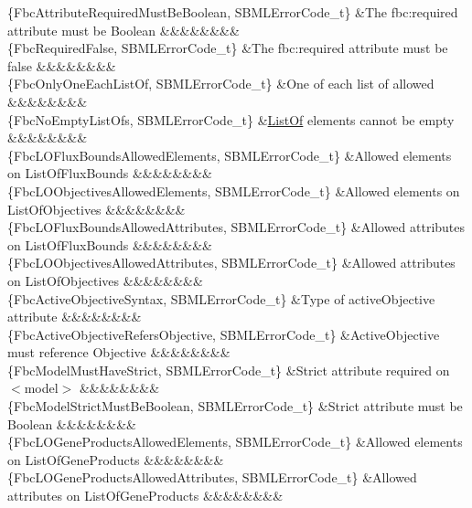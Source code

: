 \begin{DoxyParagraph}{}
\begin{longtabu}
\{Fbc\+Attribute\+Required\+Must\+Be\+Boolean, S\+B\+M\+L\+Error\+Code\+\_\+t\} &The fbc\+:required attribute must be Boolean &&&&&&&&\\
\{Fbc\+Required\+False, S\+B\+M\+L\+Error\+Code\+\_\+t\} &The fbc\+:required attribute must be \textquotesingle{}false\textquotesingle{} &&&&&&&&\\
\{Fbc\+Only\+One\+Each\+List\+Of, S\+B\+M\+L\+Error\+Code\+\_\+t\} &One of each list of allowed &&&&&&&&\\
\{Fbc\+No\+Empty\+List\+Ofs, S\+B\+M\+L\+Error\+Code\+\_\+t\} &\hyperlink{class_list_of}{List\+Of} elements cannot be empty &&&&&&&&\\
\{Fbc\+L\+O\+Flux\+Bounds\+Allowed\+Elements, S\+B\+M\+L\+Error\+Code\+\_\+t\} &Allowed elements on List\+Of\+Flux\+Bounds &&&&&&&&\\
\{Fbc\+L\+O\+Objectives\+Allowed\+Elements, S\+B\+M\+L\+Error\+Code\+\_\+t\} &Allowed elements on List\+Of\+Objectives &&&&&&&&\\
\{Fbc\+L\+O\+Flux\+Bounds\+Allowed\+Attributes, S\+B\+M\+L\+Error\+Code\+\_\+t\} &Allowed attributes on List\+Of\+Flux\+Bounds &&&&&&&&\\
\{Fbc\+L\+O\+Objectives\+Allowed\+Attributes, S\+B\+M\+L\+Error\+Code\+\_\+t\} &Allowed attributes on List\+Of\+Objectives &&&&&&&&\\
\{Fbc\+Active\+Objective\+Syntax, S\+B\+M\+L\+Error\+Code\+\_\+t\} &Type of active\+Objective attribute &&&&&&&&\\
\{Fbc\+Active\+Objective\+Refers\+Objective, S\+B\+M\+L\+Error\+Code\+\_\+t\} &Active\+Objective must reference Objective &&&&&&&&\\
\{Fbc\+Model\+Must\+Have\+Strict, S\+B\+M\+L\+Error\+Code\+\_\+t\} &\textquotesingle{}Strict\textquotesingle{} attribute required on {\ttfamily $<$model$>$} &&&&&&&&\\
\{Fbc\+Model\+Strict\+Must\+Be\+Boolean, S\+B\+M\+L\+Error\+Code\+\_\+t\} &\textquotesingle{}Strict\textquotesingle{} attribute must be Boolean &&&&&&&&\\
\{Fbc\+L\+O\+Gene\+Products\+Allowed\+Elements, S\+B\+M\+L\+Error\+Code\+\_\+t\} &Allowed elements on List\+Of\+Gene\+Products &&&&&&&&\\
\{Fbc\+L\+O\+Gene\+Products\+Allowed\+Attributes, S\+B\+M\+L\+Error\+Code\+\_\+t\} &Allowed attributes on List\+Of\+Gene\+Products &&&&&&&&\\

\end{longtabu}
\end{DoxyParagraph}
